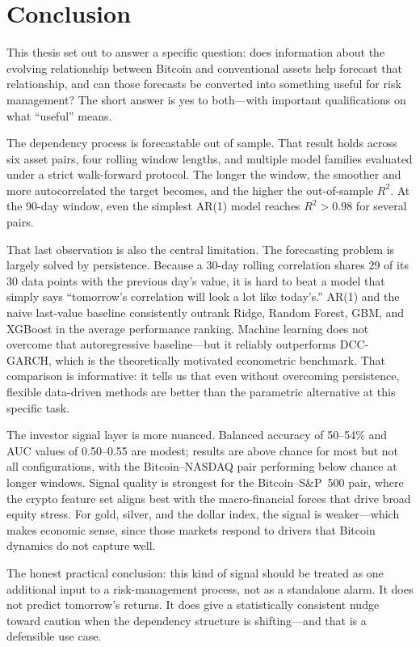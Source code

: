 \section{Conclusion}

This thesis set out to answer a specific question: does information about the evolving relationship between Bitcoin and conventional assets help forecast that relationship, and can those forecasts be converted into something useful for risk management? The short answer is yes to both---with important qualifications on what ``useful'' means.

The dependency process is forecastable out of sample. That result holds across six asset pairs, four rolling window lengths, and multiple model families evaluated under a strict walk-forward protocol. The longer the window, the smoother and more autocorrelated the target becomes, and the higher the out-of-sample $R^2$. At the 90-day window, even the simplest AR(1) model reaches $R^2 > 0.98$ for several pairs.

That last observation is also the central limitation. The forecasting problem is largely solved by persistence. Because a 30-day rolling correlation shares 29 of its 30 data points with the previous day's value, it is hard to beat a model that simply says ``tomorrow's correlation will look a lot like today's.'' AR(1) and the naive last-value baseline consistently outrank Ridge, Random Forest, GBM, and XGBoost in the average performance ranking. Machine learning does not overcome that autoregressive baseline---but it reliably outperforms DCC-GARCH, which is the theoretically motivated econometric benchmark. That comparison is informative: it tells us that even without overcoming persistence, flexible data-driven methods are better than the parametric alternative at this specific task.

The investor signal layer is more nuanced. Balanced accuracy of 50--54\% and AUC values of 0.50--0.55 are modest; results are above chance for most but not all configurations, with the Bitcoin--NASDAQ pair performing below chance at longer windows. Signal quality is strongest for the Bitcoin--S\&P~500 pair, where the crypto feature set aligns best with the macro-financial forces that drive broad equity stress. For gold, silver, and the dollar index, the signal is weaker---which makes economic sense, since those markets respond to drivers that Bitcoin dynamics do not capture well.

The honest practical conclusion: this kind of signal should be treated as one additional input to a risk-management process, not as a standalone alarm. It does not predict tomorrow's returns. It does give a statistically consistent nudge toward caution when the dependency structure is shifting---and that is a defensible use case.


